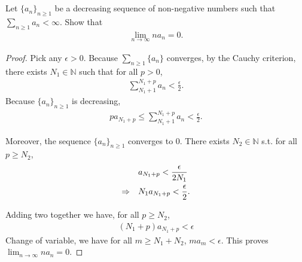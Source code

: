 \documentclass[11pt,letterpaper]{article}
\begin{document}
\setcounter{section}{3}
\section{}
Let $\{a_n\}_{n\geq 1}$ be a decreasing sequence of non-negative numbers such
that $\sum_{n\geq 1} a_n<\infty$. Show that
\begin{align}
    \lim_{n\to\infty} na_n = 0.
\end{align}

\begin{proof}
Pick any $\epsilon>0$. Because $\sum_{n\geq 1}\{a_n\}$ converges, by the Cauchy criterion, there exists $N_1\in\mathbb{N}$ such that for all $p>0$,
\begin{align}
    \sum_{N_1+1}^{N_1+p}a_n<\frac{\epsilon}{2}.
\end{align}
Because $\{a_n\}_{n\geq 1}$ is decreasing, 
\begin{align}
    pa_{N_1+p}\leq\sum_{N_1+1}^{N_1+p}a_n<\frac{\epsilon}{2}.
\end{align}

Moreover, the sequence $\{a_n\}_{n\geq 1}$ converges to 0. There exists $N_2\in\mathbb{N}$ s.t. for all $p\geq N_2$, 
\begin{align}
    &a_{N_1+p}<\frac{\epsilon}{2N_1}\\
    \Rightarrow \quad &N_1 a_{N_1+p}<\frac{\epsilon}{2}.
\end{align}

Adding two together we have, for all $p\geq N_2$, 
\begin{align}
    (N_1+p)a_{N_1+p}<\epsilon
\end{align}
Change of variable, we have for all $m\geq N_1+N_2$, $ma_m<\epsilon$. This proves $\lim_{n\rightarrow\infty}na_n = 0$. 

\end{proof}


\end{document}

